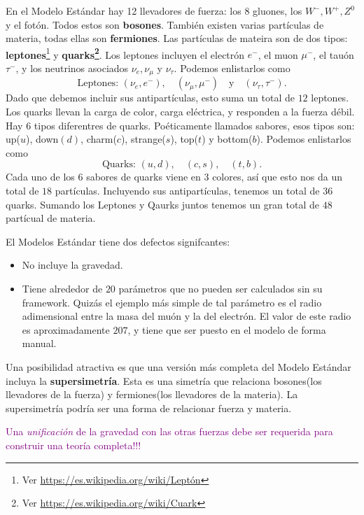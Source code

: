 En el Modelo Estándar hay 12 llevadores de fuerza: los 8 gluones, los $W^-,W^+,Z^0$ y el fotón. Todos estos son \textbf{bosones}. También existen varias partículas de materia, todas ellas son \textbf{fermiones}. Las partículas de mateira son de dos tipos: \textbf{leptones}\footnote{Ver \url{https://es.wikipedia.org/wiki/Leptón}} y \textbf{quarks\footnote{Ver \url{https://es.wikipedia.org/wiki/Cuark}}}. Los leptones incluyen el electrón $e^-$, el muon $\mu^-$, el tauón $\tau^-$, y los neutrinos asociados $\nu_e,\nu_\mu$ y $\nu_\tau$. Podemos enlistarlos como
\begin{equation}
    \text{Leptones: } (\nu_e,e^-),\quad (\nu_\mu,\mu^-)\quad\text{y}\quad (\nu_\tau,\tau^-).
\end{equation}
Dado que debemos incluir sus antipartículas, esto suma un total de $12$ leptones. Los quarks llevan la carga de color, carga eléctrica, y responden a la fuerza débil. Hay $6$ tipos diferentres de quarks. Poéticamente llamados sabores, esos tipos son: up($u$), down$(d)$, charm($c$), strange($s$), top($t$) y bottom($b$). Podemos enlistarlos como
\begin{equation}
    \text{Quarks: } (u,d),\quad (c,s),\quad (t,b).
\end{equation}
Cada uno de los $6$ sabores de quarks viene en $3$ colores, así que esto nos da un total de $18$ partículas. Incluyendo sus antipartículas, tenemos un total de $36$ quarks. Sumando los Leptones y Qaurks juntos tenemos un gran total de $48$ partícual de materia.

El Modelos Estándar tiene dos defectos signifcantes:
\begin{itemize}
    \item No incluye la gravedad.
    \item Tiene alrededor de $20$ parámetros que no pueden ser calculados sin su framework. Quizás el ejemplo más simple de tal parámetro es el radio adimensional entre la masa del muón y la del electrón. El valor de este radio es aproximadamente $207$, y tiene que ser puesto en el modelo de forma manual.
\end{itemize}

    Una posibilidad atractiva es que una versión más completa del Modelo Estándar incluya la \textbf{supersimetría}. Esta es una simetría que relaciona bosones(los llevadores de la fuerza) y fermiones(los llevadores de la materia). La supersimetría podría ser una forma de relacionar fuerza y materia.

    \textcolor{purple}{Una \textit{unificación} de la gravedad con las otras fuerzas debe ser requerida para construir una teoría completa!!!}

